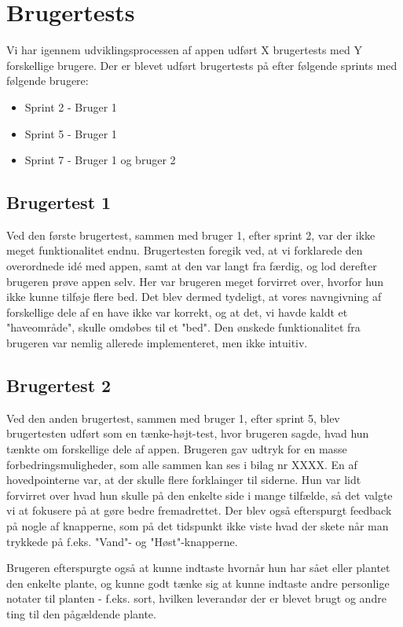 \section{Brugertests}
Vi har igennem udviklingsprocessen af appen udført X brugertests med Y forskellige brugere. Der er blevet udført brugertests på efter følgende sprints med følgende brugere:
\begin{itemize}
    \item Sprint 2 - Bruger 1
    \item Sprint 5 - Bruger 1
    \item Sprint 7 - Bruger 1 og bruger 2
\end{itemize}

\subsection{Brugertest 1}
Ved den første brugertest, sammen med bruger 1, efter sprint 2, var der ikke meget funktionalitet endnu. Brugertesten foregik ved, at vi forklarede den overordnede idé med appen, samt at den var langt fra færdig, og lod derefter brugeren prøve appen selv. Her var brugeren meget forvirret over, hvorfor hun ikke kunne tilføje flere bed. Det blev dermed tydeligt, at vores navngivning af forskellige dele af en have ikke var korrekt, og at det, vi havde kaldt et "haveområde", skulle omdøbes til et "bed". Den ønskede funktionalitet fra brugeren var nemlig allerede implementeret, men ikke intuitiv.

\subsection{Brugertest 2}

Ved den anden brugertest, sammen med bruger 1, efter sprint 5, blev brugertesten udført som en tænke-højt-test, hvor brugeren sagde, hvad hun tænkte om forskellige dele af appen.
Brugeren gav udtryk for en masse forbedringsmuligheder, som alle sammen kan ses i bilag nr XXXX. En af hovedpointerne var, at der skulle flere forklainger til siderne. Hun var lidt forvirret over hvad hun skulle på den enkelte side i mange tilfælde, så det valgte vi at fokusere på at gøre bedre fremadrettet.
Der blev også efterspurgt feedback på nogle af knapperne, som på det tidspunkt ikke viste hvad der skete når man trykkede på f.eks. "Vand"- og "Høst"-knapperne.

Brugeren efterspurgte også at kunne indtaste hvornår hun har sået eller plantet den enkelte plante, og kunne godt tænke sig at kunne indtaste andre personlige notater til planten - f.eks. sort, hvilken leverandør der er blevet brugt og andre ting til den pågældende plante.

